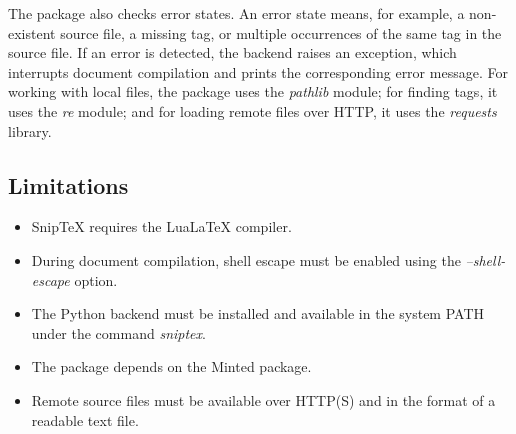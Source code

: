 \documentclass{article}
\begin{document}
The package also checks error states. An error state means, for example, a non-existent source file, 
a missing tag, or multiple occurrences of the same tag in the source file. If an error is detected, 
the backend raises an exception, which interrupts document compilation and prints the corresponding error message. 
For working with local files, the package uses the \textit{pathlib} module; for finding tags, it uses the \textit{re} module; 
and for loading remote files over HTTP, it uses the \textit{requests} library.

\subsection*{Limitations}

\begin{itemize}
    \item Snip\TeX{} requires the LuaLa\TeX{} compiler.
    
    \item During document compilation, 
    shell escape must be enabled using the \textit{--shell-escape} option.

    \item The Python backend must be installed and available in the system PATH 
    under the command \textit{sniptex}.

    \item The package depends on the Minted package.

    \item Remote source files must be available over HTTP(S) and in the format of 
    a readable text file.
\end{itemize}



\end{document}
